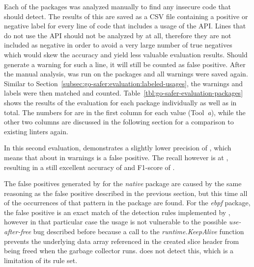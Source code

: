 

Each of the  packages was analyzed manually to find any insecure code that \toolSafer{} should detect.
The results of this are saved as a \acrshort{CSV} file containing a positive or negative label for every line of code
that includes a usage of the \unsafe{} \acrshort{API}.
Lines that do not use the \acrshort{API} should not be analyzed by \toolSafer{} at all, therefore they are not included
as negative in order to avoid a very large number of true negatives which would skew the accuracy and yield less
valuable evaluation results.
Should \toolSafer{} generate a warning for such a line, it will still be counted as false positive.
After the manual analysis, \toolSafer{} was run on the packages and all warnings were saved again.
Similar to Section~\ref{subsec:go-safer:evaluation:labeled-usages}, the warnings and labels were then matched and
counted.
Table~\ref{tbl:go-safer-evaluation-packages} shows the results of the evaluation for each package individually as well
as in total.
The numbers for \toolSafer{} are in the first column for each value (Tool~\textit{a}), while the other two columns are
discussed in the following section for a comparison to existing linters again.



In this second evaluation, \toolSafer{} demonstrates a slightly lower precision of , which means that
about  in  warnings is a false positive.
The recall however is at , resulting in a still excellent accuracy of  and F1-score of
.

The false positives generated by \toolSafer{} for the \textit{native} package are caused by the same reasoning as the
false positive described in the previous section, but this time all of the occurrences of that pattern in the package
are found.
For the \textit{ebpf} package, the false positive is an exact match of the detection rules implemented by \toolSafer{},
however in that particular case the usage is not vulnerable to the possible \textit{use-after-free} bug described before
because a call to the \textit{runtime.KeepAlive} function prevents the underlying data array referenced in the created
slice header from being freed when the garbage collector runs.
\toolSafer{} does not detect this, which is a limitation of its rule set.


